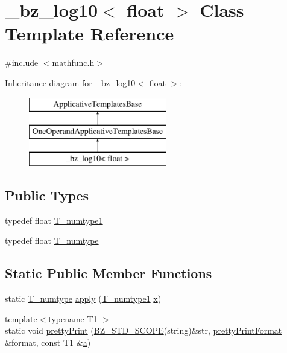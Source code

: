 \hypertarget{class__bz__log10_3_01float_01_4}{}\section{\+\_\+bz\+\_\+log10$<$ float $>$ Class Template Reference}
\label{class__bz__log10_3_01float_01_4}


{\ttfamily \#include $<$mathfunc.\+h$>$}

Inheritance diagram for \+\_\+bz\+\_\+log10$<$ float $>$\+:\begin{figure}[H]
\begin{center}
\leavevmode
\includegraphics[height=3.000000cm]{class__bz__log10_3_01float_01_4}
\end{center}
\end{figure}
\subsection*{Public Types}
\begin{DoxyCompactItemize}
\item 
typedef float \hyperlink{class__bz__log10_3_01float_01_4_a07ffaa91a92bcb12c00bc040abfdf85d}{T\+\_\+numtype1}
\item 
typedef float \hyperlink{class__bz__log10_3_01float_01_4_a8bf759afe9f5c17e2c52d1aa1e9b8c7e}{T\+\_\+numtype}
\end{DoxyCompactItemize}
\subsection*{Static Public Member Functions}
\begin{DoxyCompactItemize}
\item 
static \hyperlink{class__bz__log10_3_01float_01_4_a8bf759afe9f5c17e2c52d1aa1e9b8c7e}{T\+\_\+numtype} \hyperlink{class__bz__log10_3_01float_01_4_a707b466b6396e8e1bf5f8088fc3ff883}{apply} (\hyperlink{class__bz__log10_3_01float_01_4_a07ffaa91a92bcb12c00bc040abfdf85d}{T\+\_\+numtype1} \hyperlink{vecnorm1_8cc_ac73eed9e41ec09d58f112f06c2d6cb63}{x})
\item 
{\footnotesize template$<$typename T1 $>$ }\\static void \hyperlink{class__bz__log10_3_01float_01_4_a1022ae56fd982cb340d85c812e04f1a0}{pretty\+Print} (\hyperlink{numinquire_8h_a2b24ffc3b4ef9803956bc7715c6c7b83}{B\+Z\+\_\+\+S\+T\+D\+\_\+\+S\+C\+O\+P\+E}(string)\&str, \hyperlink{classprettyPrintFormat}{pretty\+Print\+Format} \&format, const T1 \&\hyperlink{gen__mat5files_8m_aae328bf20413f220e38aec4d95bfd6da}{a})
\end{DoxyCompactItemize}


